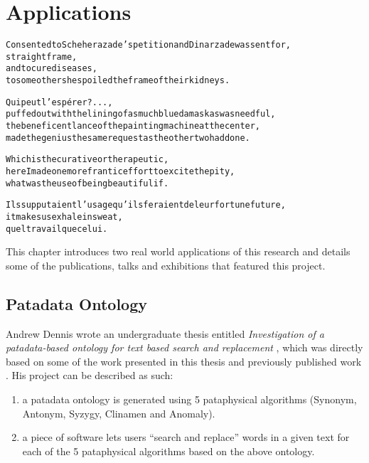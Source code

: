 
\chapter{Applications}
\label{ch:applications}

\startcontents[chapters]

\vfill

\begin{alltt}\sffamily
Consented to Scheherazade's petition and Dinarzade was sent for,
straight frame,
and to cure diseases,
to some others he spoiled the frame of their kidneys.

Qui peut l'espérer ?...,
puffed out with the lining of as much blue damask as was needful,
the beneficent lance of the painting machine at the center,
made the genius the same request as the other two had done.

Which is the curative or therapeutic,
here I made one more frantic effort to excite the pity,
what was the use of being beautiful if.

Ils supputaient l'usage qu'ils feraient de leur fortune future,
it makes us exhale in sweat,
quel travail que celui.
\end{alltt}

\newpage
\minicontents
\spirals

This chapter introduces two real world applications of this research and details some of the publications, talks and exhibitions that featured this project. 


\section{Patadata Ontology}
\label{s:dennis}

Andrew Dennis wrote an undergraduate thesis entitled \textit{Investigation of a patadata-based ontology for text based search and replacement} \autocite*{Dennis2016}, which was directly based on some of the work presented in this thesis and previously published work \autocite{Raczinski2013,Hugill2013d}. His project can be described as such:

\begin{enumerate}
  \item a patadata ontology is generated using 5 pataphysical algorithms (Synonym, Antonym, Syzygy, Clinamen and Anomaly).
  \item a piece of software lets users ``search and replace'' words in a given text for each of the 5 pataphysical algorithms based on the above ontology.
\end{enumerate}

